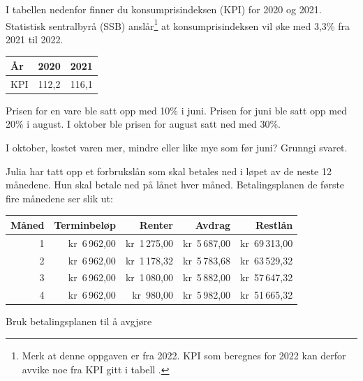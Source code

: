 
I tabellen nedenfor finner du
konsumprisindeksen (KPI)
for 2020 og 2021.
Statistisk sentralbyrå (SSB) anslår\footnote{Merk at denne oppgaven er fra 2022. KPI som beregnes for 2022 kan derfor avvike noe fra KPI gitt i tabell \pageref{kpitable}.} at
konsumprisindeksen vil øke med
3,3\% fra 2021 til 2022.
\begin{center}
	\small
	\begin{tabular}{| l | c | c |}
		År & 2020 & 2021 \\ \hline
		KPI & 112,2 & 116,1
	\end{tabular}
\end{center}

Prisen for en vare ble satt opp med 10\% i juni. Prisen for juni ble satt opp med 20\% i august. I oktober ble prisen for august satt ned med 30\%. \os

I oktober, kostet varen mer, mindre eller like mye som før juni? Grunngi svaret.


Julia har tatt opp et forbrukslån som skal betales ned i løpet av de
neste 12 månedene. Hun skal betale ned på lånet hver måned.
Betalingsplanen de første fire månedene ser slik ut:
\begin{center}
	\small
	\begin{tabular}{|r|r|r|r|r|}
		\hline
		\textbf{Måned} & \textbf{Terminbeløp} & \textbf{Renter} & \textbf{Avdrag} & \textbf{Restlån} \\
		\hline
		1 & kr\ 6\,962,00 & kr\ 1\,275,00 & kr\ 5\,687,00 & kr\ 69\,313,00 \\
		\hline
		2 & kr\ 6\,962,00 & kr\ 1\,178,32 & kr\ 5\,783,68 & kr\ 63\,529,32 \\
		\hline
		3 & kr\ 6\,962,00 & kr\ 1\,080,00 & kr\ 5\,882,00 & kr\ 57\,647,32 \\
		\hline
		4 & kr\ 6\,962,00 & kr\ 980,00 & kr\ 5\,982,00 & kr\ 51\,665,32 \\
		\hline
	\end{tabular}
\end{center}
Bruk betalingsplanen til å avgjøre

